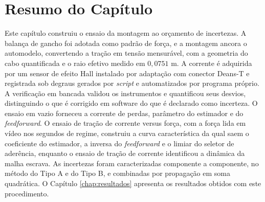 \section{Resumo do Capítulo}

Este capítulo construiu o ensaio da montagem ao orçamento de incertezas. A balança de gancho
foi adotada como padrão de força, e a montagem ancora o automodelo, convertendo a tração em
tensão mensurável, com a geometria do cabo quantificada e o raio efetivo medido em
$0{,}0751$ m. A corrente é adquirida por um sensor de efeito Hall instalado por adaptação
com conector Deans-T e registrada sob degraus gerados por
\emph{script} e automatizados por programa próprio. A verificação em bancada validou os
instrumentos e quantificou seus desvios, distinguindo o que é corrigido em software do que
é declarado como incerteza. O ensaio em vazio forneceu a corrente de perdas, parâmetro do
estimador e do \emph{feedforward}. O ensaio de tração de corrente versus força, com a força
lida em vídeo nos segundos de regime, construiu a curva característica da qual saem o
coeficiente do estimador, a inversa do \emph{feedforward} e o limiar do seletor de
aderência, enquanto o ensaio de tração de corrente identificou a dinâmica da malha escrava.
As incertezas foram caracterizadas componente a componente, no método do Tipo A e do Tipo
B, e combinadas por propagação em soma quadrática. O Capítulo \ref{chap:resultados}
apresenta os resultados obtidos com este procedimento.

\clearpage
